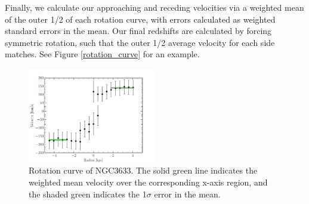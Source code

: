 \documentclass[iop]{emulateapj-rtx4}
\begin{document}
Finally, we calculate our approaching and receding velocities via a weighted mean of the outer 1/2 of each rotation curve, with errors calculated as weighted standard errors in the mean. Our final redshifts are calculated by forcing symmetric rotation, such that the outer 1/2 average velocity for each side matches. See Figure \ref{rotation_curve} for an example.

\begin{figure}[b!]
        \centering
        \vspace{0pt}
        \includegraphics[width=0.50\textwidth]{NGC3633_rotation_curve_xphys_helio_vemit.pdf}
        \caption{\small{Rotation curve of NGC3633. The solid green line indicates the weighted mean velocity over the corresponding x-axis region, and the shaded green indicates the 1$\sigma$ error in the mean.}}
        \label{completeness}
\end{figure}
\end{document}
